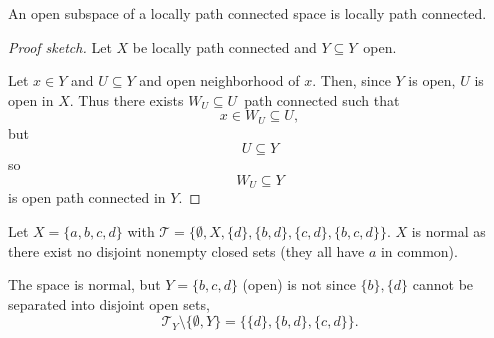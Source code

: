 \documentclass[11pt]{article}
\begin{document}
\begin{prop}\label{prop:open_subspace_locally_path}
    An open subspace of a locally path connected space is locally path 
    connected. 
\end{prop}
\begin{proof}[Proof sketch]
    Let $X$ be locally path connected and 
    $Y \subseteq Y$ open. 

    Let $x \in Y$ and $U \subseteq Y$ and open neighborhood of 
    $x$. Then, since $Y$ is open, $U$ is open in $X$. 
    Thus there exists $W_U \subseteq U$ path connected such that 
    \[
        x \in W_U \subseteq U, 
    \]
    but 
    \[
        U \subseteq Y 
    \]
    so 
    \[
        W_U \subseteq Y 
    \]
    is open path connected in $Y$. 
\end{proof}

\begin{ex}\label{ex:open_subspace_normal}
    Let $X = \{a,b,c,d\}$ with 
    $\mathcal T = \{\emptyset, X, \{d\}, \{b,d\}, 
    \{c,d\}, \{b,c,d\}\}$. 
    $X$ is normal as there 
    exist no disjoint nonempty closed sets (they all 
    have $a$ in common). 

    The space is normal, but 
    $Y = \{b,c,d\}$ (open) is not 
    since $\{b\}, \{d\}$ cannot be separated 
    into disjoint open sets, 
    \[
        \mathcal T_Y \setminus \{\emptyset, Y\} = \{
        \{d\}, \{b,d\}, \{c,d\}\}. 
    \]
\end{ex}
\end{document}
